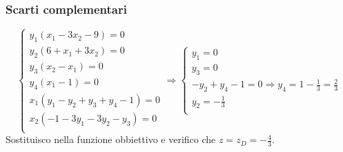 \documentclass[\main/main.tex]{subfiles}
\begin{document}
\subsubsection*{Scarti complementari}
\[
  \begin{cases}
    y_1 (x_1 - 3x_2 - 9) = 0         \\
    y_2 (6 + x_1 + 3x_2) = 0         \\
    y_3 (x_2 - x_1) = 0              \\
    y_4 (x_1 -1) = 0                 \\
    x_1 (y_1 -y_2 + y_3 +y_4 -1) = 0 \\
    x_2 (-1-3y_1 - 3y_2 -y_3) = 0    \\
  \end{cases}
  \Rightarrow
  \begin{cases}
    y_1 = 0                                                         \\
    y_3 = 0                                                         \\
    -y_2 +y_4 -1 = 0 \Rightarrow y_4 = 1 -\frac{1}{3} = \frac{2}{3} \\
    y_2 = -\frac{1}{3}                                              \\
  \end{cases}
\]
Sostituisco nella funzione obbiettivo e verifico che $z = z_D = -\frac{4}{3}$.
\end{document}
